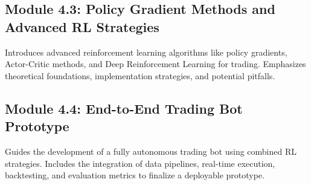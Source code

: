 \documentclass{article}
\begin{document}
\subsection{Module 4.3: Policy Gradient Methods and Advanced RL Strategies}
Introduces advanced reinforcement learning algorithms like policy gradients, Actor-Critic methods, and Deep Reinforcement Learning for trading. Emphasizes theoretical foundations, implementation strategies, and potential pitfalls.

\subsection{Module 4.4: End-to-End Trading Bot Prototype}
Guides the development of a fully autonomous trading bot using combined RL strategies. Includes the integration of data pipelines, real-time execution, backtesting, and evaluation metrics to finalize a deployable prototype.
\end{document}
